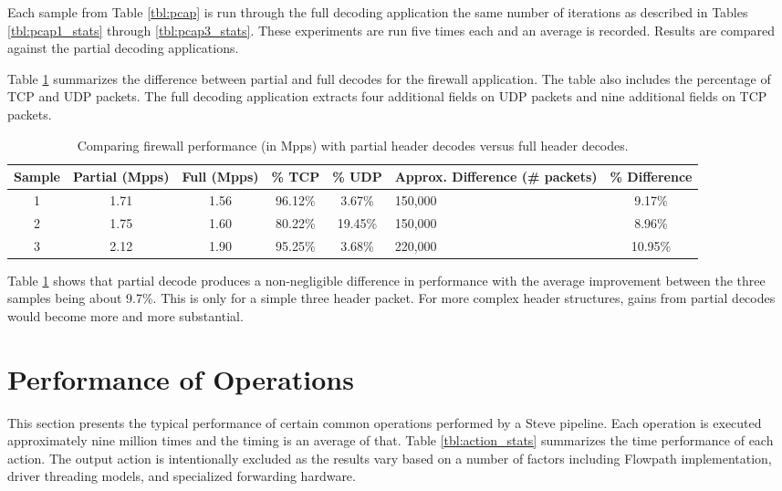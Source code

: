 Each sample from Table \ref{tbl:pcap} is run through the full decoding application the same number of iterations as described in Tables \ref{tbl:pcap1_stats} through \ref{tbl:pcap3_stats}. These experiments are run five times each and an average is recorded. Results are compared against the partial decoding applications.

Table \ref{tbl:firewall_cmp} summarizes the difference between partial and full decodes for the firewall application. The table also includes the percentage of TCP and UDP packets. The full decoding application extracts four additional fields on UDP packets and nine additional fields on TCP packets. 

\begin{table}
\caption{Comparing firewall performance (in Mpps) with partial header decodes versus full header decodes.}
\begin{center}
\begin{tabularx}{\linewidth}{| c || c | c | c | c | X | c |}
\hline
Sample & Partial (Mpps) & Full (Mpps) & \% TCP & \% UDP & Approx. Difference (\# packets) & \% Difference \\
\hline
1 & 1.71 & 1.56 & 96.12\% & 3.67\% & 150,000 & 9.17\% \\
\hline
2 & 1.75 & 1.60 & 80.22\% & 19.45\% & 150,000 & 8.96\% \\
\hline
3 & 2.12 & 1.90 & 95.25\% & 3.68\% & 220,000 & 10.95\% \\ 
\hline
\end{tabularx}
\end{center}
\label{tbl:firewall_cmp}
\end{table}


Table \ref{tbl:firewall_cmp} shows that partial decode produces a non-negligible difference in performance with the average improvement between the three samples being about 9.7\%. This is only for a simple three header packet. For more complex header structures, gains from partial decodes would become more and more substantial.


\section{Performance of Operations} \label{exp:action_performance}

This section presents the typical performance of certain common operations performed by a Steve pipeline. Each operation is executed approximately nine million times and the timing is an average of that. Table \ref{tbl:action_stats} summarizes the time performance of each action. The output action is intentionally excluded as the results vary based on a number of factors including Flowpath implementation, driver threading models, and specialized forwarding hardware.

